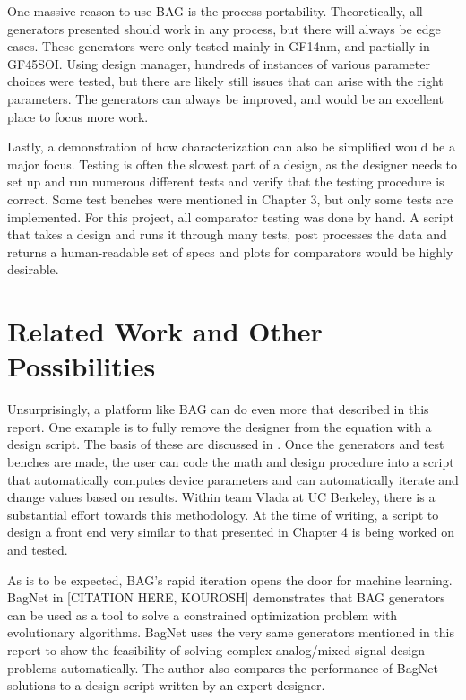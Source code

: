 One massive reason to use BAG is the process portability. Theoretically, all generators presented should work in any process, but there will always be edge cases. These generators were only tested mainly in GF14nm, and partially in GF45SOI. Using design manager, hundreds of instances of various parameter choices were tested, but there are likely still issues that can arise with the right parameters. The generators can always be improved, and would be an excellent place to focus more work.

Lastly, a demonstration of how characterization can also be simplified would be a major focus. Testing is often the slowest part of a design, as the designer needs to set up and run numerous different tests and verify that the testing procedure is correct. Some test benches were mentioned in Chapter 3, but only some tests are implemented. For this project, all comparator testing was done by hand. A script that takes a design and runs it through many tests, post processes the data and returns a human-readable set of specs and plots for comparators would be highly desirable. 
\section{Related Work and Other Possibilities}
Unsurprisingly, a platform like BAG can do even more that described in this report. One example is to fully remove the designer from the equation with a design script. The basis of these are discussed in \cite{chang_bag2:_2018}. Once the generators and test benches are made, the user can code the math and design procedure into a script that automatically computes device parameters and can automatically iterate and change values based on results. Within team Vlada at UC Berkeley, there is a substantial effort towards this methodology. At the time of writing, a script to design a front end very similar to that presented in Chapter 4 is being worked on and tested.

As is to be expected, BAG's rapid iteration opens the door for machine learning. BagNet in [CITATION HERE, KOUROSH] demonstrates that BAG generators can be used as a tool to solve a constrained optimization problem with evolutionary algorithms. BagNet uses the very same generators mentioned in this report to show the feasibility of solving complex analog/mixed signal design problems automatically. The author also compares the performance of BagNet solutions to a design script written by an expert designer.